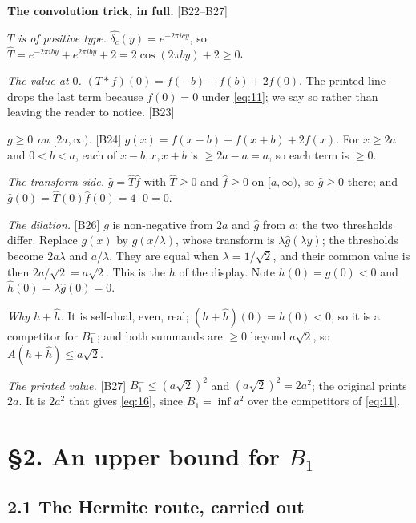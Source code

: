 \documentclass[11pt,reqno]{amsart}
\theoremstyle{plain}
\theoremstyle{definition}
\theoremstyle{remark}
\newcommand{\fh}{\widehat{f}}
\newcommand{\Ledger}[1]{{\scriptsize\textsf{[#1]}}}
\begin{document}
\begin{expansion}
\textbf{The convolution trick, in full.} \Ledger{B22--B27}

\emph{$T$ is of positive type.} $\widehat{\delta_c}(y)=e^{-2\pi icy}$, so
$\widehat T=e^{-2\pi iby}+e^{2\pi iby}+2=2\cos(2\pi by)+2\ge0$.

\emph{The value at $0$.} $(T*f)(0)=f(-b)+f(b)+2f(0)$. The printed line drops the last
term because $f(0)=0$ under \eqref{eq:11}; we say so rather than leaving the reader to
notice. \Ledger{B23}

\emph{$g\ge0$ on $[2a,\infty)$.} \Ledger{B24} $g(x)=f(x-b)+f(x+b)+2f(x)$. For
$x\ge2a$ and $0<b<a$, each of $x-b,x,x+b$ is $\ge2a-a=a$, so each term is $\ge0$.

\emph{The transform side.} $\widehat g=\widehat T\fh$ with $\widehat T\ge0$ and
$\fh\ge0$ on $[a,\infty)$, so $\widehat g\ge0$ there; and
$\widehat g(0)=\widehat T(0)\fh(0)=4\cdot0=0$.

\emph{The dilation.} \Ledger{B26} $g$ is non-negative from $2a$ and $\widehat g$ from
$a$: the two thresholds differ. Replace $g(x)$ by $g(x/\lambda)$, whose transform is
$\lambda\widehat g(\lambda y)$; the thresholds become $2a\lambda$ and $a/\lambda$.
They are equal when $\lambda=1/\sqrt2$, and their common value is then
$2a/\sqrt2=a\sqrt2$. This is the $h$ of the display. Note $h(0)=g(0)<0$ and
$\widehat h(0)=\lambda\widehat g(0)=0$.

\emph{Why $h+\widehat h$.} It is self-dual, even, real; $(h+\widehat h)(0)=h(0)<0$, so
it is a competitor for $B_1^-$; and both summands are $\ge0$ beyond $a\sqrt2$, so
$A(h+\widehat h)\le a\sqrt2$.

\emph{The printed value.} \Ledger{B27} $B_1^-\le(a\sqrt2)^2$ and $(a\sqrt2)^2=2a^2$;
the original prints $2a$. It is $2a^2$ that gives \eqref{eq:16}, since
$B_1=\inf a^2$ over the competitors of \eqref{eq:11}.
\end{expansion}

\section*{\S2. An upper bound for $B_1$}

\subsection*{2.1 The Hermite route, carried out}
\end{document}
